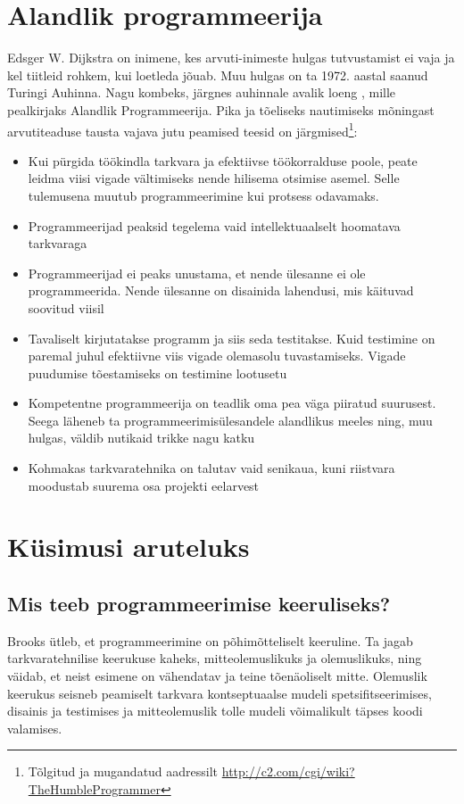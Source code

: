 \documentclass{tufte-book}
\begin{document}
\section{Alandlik programmeerija}
\label{humble}
Edsger W. Dijkstra on inimene, kes arvuti-inimeste hulgas tutvustamist ei vaja ja kel tiitleid rohkem, kui loetleda jõuab. Muu hulgas on ta 1972. aastal saanud Turingi Auhinna. Nagu kombeks, järgnes auhinnale avalik loeng \citep{yourdon1979classics}, mille pealkirjaks Alandlik Programmeerija. Pika ja tõeliseks nautimiseks mõningast arvutiteaduse tausta vajava jutu peamised teesid on järgmised\footnote{Tõlgitud ja mugandatud aadressilt \url{http://c2.com/cgi/wiki?TheHumbleProgrammer}}:
\begin{itemize}
	\item Kui pürgida töökindla tarkvara ja efektiivse töökorralduse poole, peate leidma viisi vigade vältimiseks nende hilisema otsimise asemel. Selle tulemusena muutub programmeerimine kui protsess odavamaks.
	\item Programmeerijad peaksid tegelema vaid intellektuaalselt hoomatava tarkvaraga
	\item Programmeerijad ei peaks unustama, et nende ülesanne ei ole programmeerida. Nende ülesanne on disainida lahendusi, mis käituvad soovitud viisil
	\item Tavaliselt kirjutatakse programm ja siis seda testitakse. Kuid testimine on paremal juhul efektiivne viis vigade olemasolu tuvastamiseks. Vigade puudumise  tõestamiseks on testimine lootusetu
	\item Kompetentne programmeerija on teadlik oma pea väga piiratud suurusest. Seega läheneb ta programmeerimisülesandele alandlikus meeles ning, muu hulgas, väldib nutikaid trikke nagu katku
	\item Kohmakas tarkvaratehnika on talutav vaid senikaua, kuni riistvara moodustab suurema osa projekti eelarvest
\end{itemize}

\section{Küsimusi aruteluks}
\subsection{Mis teeb programmeerimise keeruliseks?}

Brooks ütleb, et programmeerimine on põhimõtteliselt keeruline\cite{brooks1975mythical}. Ta jagab tarkvaratehnilise keerukuse kaheks, mitteolemuslikuks ja olemuslikuks, ning väidab, et neist esimene on vähendatav ja teine tõenäoliselt mitte. Olemuslik keerukus seisneb peamiselt tarkvara kontseptuaalse mudeli spetsifitseerimises, disainis ja testimises ja mitteolemuslik tolle mudeli võimalikult täpses koodi valamises. 
\end{document}
